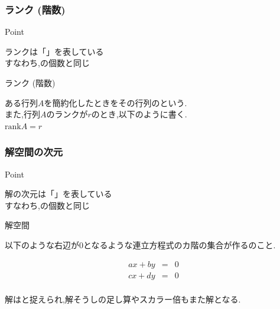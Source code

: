 \documentclass[a4paper]{jsarticle}
\begin{document}
\subsubsection{ランク (階数)}
\begin{itembox}[l]{Point}
    \begin{center}
        ランクは「」を表している\\
        すなわち,の個数と同じ
    \end{center}
\end{itembox}
\begin{itembox}[l]{ランク (階数)}
    \begin{center}
        ある行列$A$を簡約化したときをその行列のという.\\
        また,行列$A$のランクが$r$のとき,以下のように書く.\\
        $\mathrm{rank}A=r$\\
    \end{center}
\end{itembox}
\subsubsection{解空間の次元}
\begin{itembox}[l]{Point}
    \begin{center}
        解の次元は「」を表している\\
        すなわち,の個数と同じ
    \end{center}
\end{itembox}
\begin{itembox}[l]{解空間}
    \begin{center}
        以下のような右辺が$0$となるような連立方程式のカ階の集合が作るのこと.
    \end{center}
    \begin{eqnarray*}
        ax+by&=&0\\
        cx+dy&=&0\\
    \end{eqnarray*}
    \begin{center}
        解はと捉えられ,解そうしの足し算やスカラー倍もまた解となる.
    \end{center}
\end{itembox}
\end{document}
